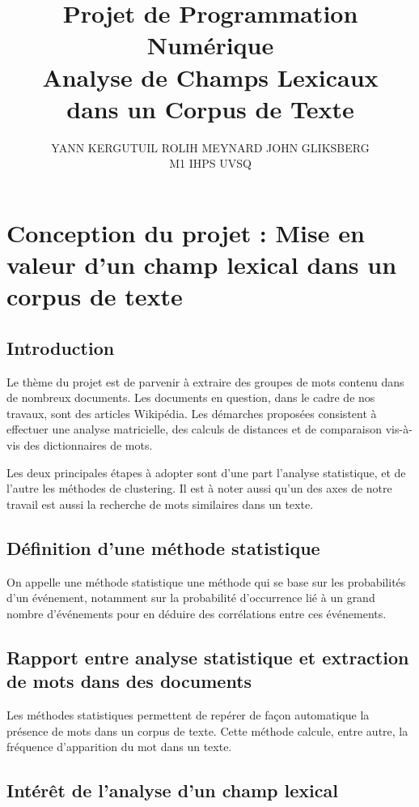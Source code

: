 \documentclass[a4paper,10pt]{article}
\title{Projet de Programmation Num\'erique\\
\textbf{Analyse de Champs Lexicaux\\
dans un Corpus de Texte}}
\author{
Y{\small ANN} KERGUTUIL \quad
R{\small OLIH} MEYNARD \quad
J{\small OHN} GLIKSBERG\\
M1 IHPS UVSQ}
\date{}
\begin{document}
\maketitle

\section{Conception du projet :
Mise en valeur d’un champ lexical
dans un corpus de texte}

\subsection*{Introduction}

Le thème du projet est de parvenir à extraire des groupes de mots
contenu dans de nombreux documents. Les documents en question,
dans le cadre de nos travaux, sont des articles Wikipédia.
Les démarches proposées consistent à effectuer une analyse matricielle,
des calculs de distances et de comparaison vis-à-vis des
dictionnaires de mots.

Les deux principales étapes à adopter sont d’une part l’analyse
statistique, et de l’autre les méthodes de clustering.
Il est à noter aussi qu’un des axes de notre travail est aussi
la recherche de mots similaires dans un texte.

\subsection*{Définition d’une méthode statistique}

On appelle une méthode statistique une méthode qui se base sur
les probabilités d’un événement, notamment sur la probabilité
d’occurrence lié à un grand nombre d’événements pour en déduire des
corrélations entre ces événements.

\subsection*{Rapport entre analyse statistique et extraction
de mots dans des documents}

Les méthodes statistiques permettent de repérer de façon automatique
la présence de mots dans un corpus de texte.
Cette méthode calcule, entre autre, la fréquence d’apparition du mot
dans un texte.

\subsection*{Intérêt de l’analyse d’un champ lexical}
\end{document}
